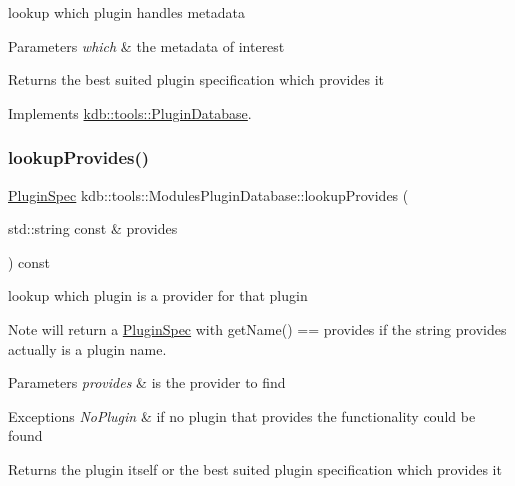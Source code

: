 lookup which plugin handles metadata 


\begin{DoxyParams}{Parameters}
{\em which} & the metadata of interest\\
\hline
\end{DoxyParams}
\begin{DoxyReturn}{Returns}
the best suited plugin specification which provides it 
\end{DoxyReturn}


Implements \mbox{\hyperlink{classkdb_1_1tools_1_1PluginDatabase_a03a416f66d6525f46929e5a68d9db3f7}{kdb\+::tools\+::\+Plugin\+Database}}.

\mbox{\label{classkdb_1_1tools_1_1ModulesPluginDatabase_acdb15c10fc34f74687ecbbf8bac526f6}} 
\subsubsection{\texorpdfstring{lookupProvides()}{lookupProvides()}}
{\footnotesize\ttfamily \mbox{\hyperlink{classkdb_1_1tools_1_1PluginSpec}{Plugin\+Spec}} kdb\+::tools\+::\+Modules\+Plugin\+Database\+::lookup\+Provides (\begin{DoxyParamCaption}\item[{std\+::string const \&}]{provides }\end{DoxyParamCaption}) const\hspace{0.3cm}{\ttfamily [virtual]}}



lookup which plugin is a provider for that plugin 

\begin{DoxyNote}{Note}
will return a \mbox{\hyperlink{classkdb_1_1tools_1_1PluginSpec}{Plugin\+Spec}} with get\+Name() == provides if the string provides actually is a plugin name.
\end{DoxyNote}

\begin{DoxyParams}{Parameters}
{\em provides} & is the provider to find\\
\hline
\end{DoxyParams}

\begin{DoxyExceptions}{Exceptions}
{\em No\+Plugin} & if no plugin that provides the functionality could be found\\
\hline
\end{DoxyExceptions}
\begin{DoxyReturn}{Returns}
the plugin itself or the best suited plugin specification which provides it 
\end{DoxyReturn}


